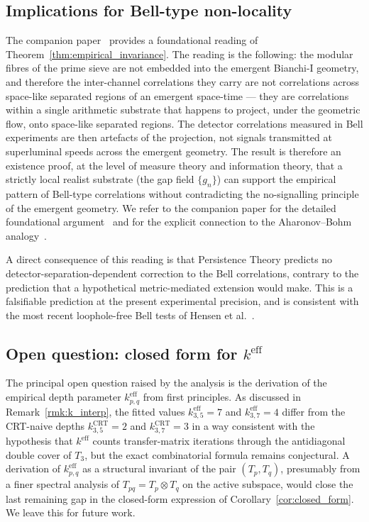 \subsection{Implications for Bell-type non-locality}
\label{ssec:bell_implications}

The companion paper~\cite{PT_HOLONOMY_NONLOCALITY} provides a
foundational reading of Theorem~\ref{thm:empirical_invariance}.
The reading is the following: the modular fibres of the prime
sieve are not embedded into the emergent Bianchi-I geometry, and
therefore the inter-channel correlations they carry are not
correlations across space-like separated regions of an emergent
space-time --- they are correlations within a single arithmetic
substrate that happens to project, under the geometric flow, onto
space-like separated regions. The detector correlations measured in
Bell experiments are then artefacts of the projection, not signals
transmitted at superluminal speeds across the emergent
geometry. The result is therefore an existence proof, at the level
of measure theory and information theory, that a strictly local
realist substrate (the gap field $\{g_n\}$) can support the
empirical pattern of Bell-type correlations without contradicting
the no-signalling principle of the emergent geometry. We refer to
the companion paper for the detailed foundational
argument~\cite[\S~3--\S~5]{PT_HOLONOMY_NONLOCALITY} and for the
explicit connection to the Aharonov--Bohm
analogy~\cite{AharonovBohm1959}.

A direct consequence of this reading is that Persistence Theory
predicts no detector-separation-dependent
correction to the Bell correlations, contrary to the prediction
that a hypothetical metric-mediated extension would make. This is
a falsifiable prediction at the present experimental precision,
and is consistent with the most recent loophole-free Bell tests of
Hensen et al.~\cite{Hensen2015}.

\subsection{Open question: closed form for $k^{\mathrm{eff}}$}
\label{ssec:open_k}

The principal open question raised by the analysis is the
derivation of the empirical depth parameter $k_{p,q}^{\mathrm{eff}}$
from first principles. As discussed in
Remark~\ref{rmk:k_interp}, the fitted values
$k_{3,5}^{\mathrm{eff}} = 7$ and $k_{3,7}^{\mathrm{eff}} = 4$
differ from the CRT-naive depths $k_{3,5}^{\mathrm{CRT}} = 2$ and
$k_{3,7}^{\mathrm{CRT}} = 3$ in a way consistent with the
hypothesis that $k^{\mathrm{eff}}$ counts transfer-matrix
iterations through the antidiagonal double cover of $T_3$, but the
exact combinatorial formula remains conjectural. A derivation of
$k_{p,q}^{\mathrm{eff}}$ as a structural invariant of the pair
$(T_p, T_q)$, presumably from a finer spectral analysis of
$T_{pq} = T_p \otimes T_q$ on the active subspace, would close the
last remaining gap in the closed-form expression of
Corollary~\ref{cor:closed_form}. We leave this for future work.

